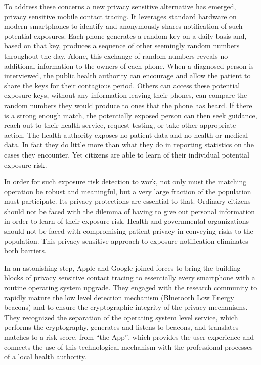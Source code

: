 To address these concerns a new privacy sensitive alternative has emerged, privacy sensitive mobile contact tracing.
It leverages standard hardware on modern smartphones to identify and anonymously shares notification of such potential exposures.
Each phone generates a random key on a daily basis and, based on that key, produces a sequence of other seemingly random numbers throughout the day.
Alone, this exchange of random numbers reveals no additional information to the owners of each phone.
When a diagnosed person is interviewed, the public health authority can encourage and allow the patient to share the keys for their contagious period.
Others can access these potential exposure keys, without any information leaving their phones, can compare the random numbers they would produce to ones that the phone has heard.
If there is a strong enough match, the potentially exposed person can then seek guidance, reach out to their health service, request testing, or take other appropriate action.
The health authority exposes no patient data and no health or medical data.
In fact they do little more than what they do in reporting statistics on the cases they encounter.
Yet citizens are able to learn of their individual potential exposure risk.

In order for such exposure risk detection to work, not only must the matching operation be robust and meaningful, but a very large fraction of the population must participate.
Its privacy protections are essential to that.
Ordinary citizens should not be faced with the dilemma of having to give out personal information in order to learn of their exposure risk.
Health and governmental organizations should not be faced with compromising patient privacy in conveying risks to the population.
This privacy sensitive approach to exposure notification eliminates both barriers.

In an astonishing step, Apple and Google joined forces to bring the building blocks of privacy sensitive contact tracing to essentially every smartphone with a routine operating system upgrade.
They engaged with the research community to rapidly mature the low level detection mechanism (Bluetooth Low Energy beacons) and to ensure the cryptographic integrity of the privacy mechanisms.
They recognized the separation of the operating system level service, which performs the cryptography, generates and listens to beacons, and translates matches to a risk score, from “the App”, which provides the user experience and connects the use of this technological mechanism with the professional processes of a local health authority.


